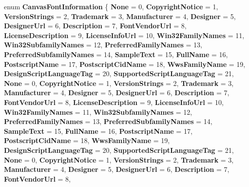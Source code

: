 \begin{DoxyCompactItemize}
enum {\bfseries Canvas\+Font\+Information} \{ \newline
{\bfseries None} = 0, 
{\bfseries Copyright\+Notice} = 1, 
{\bfseries Version\+Strings} = 2, 
{\bfseries Trademark} = 3, 
\newline
{\bfseries Manufacturer} = 4, 
{\bfseries Designer} = 5, 
{\bfseries Designer\+Url} = 6, 
{\bfseries Description} = 7, 
\newline
{\bfseries Font\+Vendor\+Url} = 8, 
{\bfseries License\+Description} = 9, 
{\bfseries License\+Info\+Url} = 10, 
{\bfseries Win32\+Family\+Names} = 11, 
\newline
{\bfseries Win32\+Subfamily\+Names} = 12, 
{\bfseries Preferred\+Family\+Names} = 13, 
{\bfseries Preferred\+Subfamily\+Names} = 14, 
{\bfseries Sample\+Text} = 15, 
\newline
{\bfseries Full\+Name} = 16, 
{\bfseries Postscript\+Name} = 17, 
{\bfseries Postscript\+Cid\+Name} = 18, 
{\bfseries Wws\+Family\+Name} = 19, 
\newline
{\bfseries Design\+Script\+Language\+Tag} = 20, 
{\bfseries Supported\+Script\+Language\+Tag} = 21, 
{\bfseries None} = 0, 
{\bfseries Copyright\+Notice} = 1, 
\newline
{\bfseries Version\+Strings} = 2, 
{\bfseries Trademark} = 3, 
{\bfseries Manufacturer} = 4, 
{\bfseries Designer} = 5, 
\newline
{\bfseries Designer\+Url} = 6, 
{\bfseries Description} = 7, 
{\bfseries Font\+Vendor\+Url} = 8, 
{\bfseries License\+Description} = 9, 
\newline
{\bfseries License\+Info\+Url} = 10, 
{\bfseries Win32\+Family\+Names} = 11, 
{\bfseries Win32\+Subfamily\+Names} = 12, 
{\bfseries Preferred\+Family\+Names} = 13, 
\newline
{\bfseries Preferred\+Subfamily\+Names} = 14, 
{\bfseries Sample\+Text} = 15, 
{\bfseries Full\+Name} = 16, 
{\bfseries Postscript\+Name} = 17, 
\newline
{\bfseries Postscript\+Cid\+Name} = 18, 
{\bfseries Wws\+Family\+Name} = 19, 
{\bfseries Design\+Script\+Language\+Tag} = 20, 
{\bfseries Supported\+Script\+Language\+Tag} = 21, 
\newline
{\bfseries None} = 0, 
{\bfseries Copyright\+Notice} = 1, 
{\bfseries Version\+Strings} = 2, 
{\bfseries Trademark} = 3, 
\newline
{\bfseries Manufacturer} = 4, 
{\bfseries Designer} = 5, 
{\bfseries Designer\+Url} = 6, 
{\bfseries Description} = 7, 
\newline
{\bfseries Font\+Vendor\+Url} = 8, 

\end{DoxyCompactItemize}
